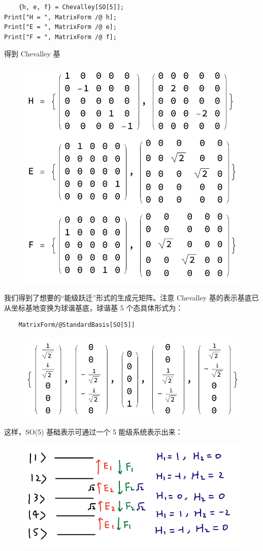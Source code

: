 \documentclass[UTF8]{ctexart}
\begin{document}
\begin{verbatim}
	{h, e, f} = Chevalley[SO[5]];
Print["H = ", MatrixForm /@ h];
Print["E = ", MatrixForm /@ e];
Print["F = ", MatrixForm /@ f];
\end{verbatim}
得到 Chevalley 基

\begin{figure}[H]
\begin{centering}
\includegraphics[width=0.4\linewidth]{include/O11}
\par\end{centering}
\end{figure}

\noindent 我们得到了想要的“能级跃迁”形式的生成元矩阵。注意 Chevalley 基的表示基底已从坐标基地变换为球谐基底，球谐基 5 个态具体形式为：

\begin{verbatim}
	MatrixForm/@StandardBasis[SO[5]]
\end{verbatim}

\begin{figure}[H]
\begin{centering}
\includegraphics[width=0.4\linewidth]{include/O12}
\par\end{centering}
\end{figure}

\noindent 这样，SO(5) 基础表示可通过一个 5 能级系统表示出来：

\begin{figure}[H]
\begin{centering}
\includegraphics[width=0.5\linewidth]{include/P3}
\par\end{centering}
\end{figure}
\end{document}
